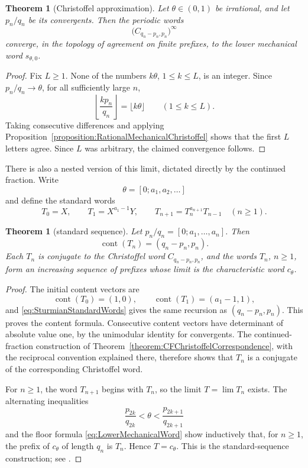 \documentclass{book}
\newtheorem{theorem}[definition]{Theorem}
\begin{document}
\begin{theorem}[Christoffel approximation]
  \label{theorem:ChristoffelApproximationSturmian}
  Let \(\theta\in(0,1)\) be irrational, and let \(p_n/q_n\) be its
  convergents.  Then the periodic words
  \[
    \bigl(C_{q_n-p_n,p_n}\bigr)^{\infty}
  \]
  converge, in the topology of agreement on finite prefixes, to the lower
  mechanical word \(s_{\theta,0}\).
\end{theorem}
\begin{proof}
  Fix \(L\geq1\).  None of the numbers \(k\theta\),
  \(1\leq k\leq L\), is an integer.  Since \(p_n/q_n\to\theta\), for all
  sufficiently large \(n\),
  \[
    \left\lfloor\frac{kp_n}{q_n}\right\rfloor
    =\lfloor k\theta\rfloor
    \qquad(1\leq k\leq L).
  \]
  Taking consecutive differences and applying
  Proposition~\ref{proposition:RationalMechanicalChristoffel} shows that
  the first \(L\) letters agree.  Since \(L\) was arbitrary, the claimed
  convergence follows.
\end{proof}

There is also a nested version of this limit, dictated directly by the
continued fraction.  Write
\[
  \theta=[0;a_1,a_2,\ldots]
\]
and define the \textnormal{standard words}
\begin{equation}\label{eq:SturmianStandardWords}
  T_0=X,\qquad T_1=X^{a_1-1}Y,\qquad
  T_{n+1}=T_n^{a_{n+1}}T_{n-1}\quad(n\geq1).
\end{equation}

\begin{theorem}[standard sequence]
  \label{theorem:SturmianStandardSequence}
  Let \(p_n/q_n=[0;a_1,\ldots,a_n]\).  Then
  \[
    \operatorname{cont}(T_n)=(q_n-p_n,p_n).
  \]
  Each \(T_n\) is conjugate to the Christoffel word
  \(C_{q_n-p_n,p_n}\), and the words \(T_n\), \(n\geq1\), form an
  increasing sequence of prefixes whose limit is the characteristic word
  \(c_\theta\).
\end{theorem}
\begin{proof}
  The initial content vectors are
  \[
    \operatorname{cont}(T_0)=(1,0),
    \qquad \operatorname{cont}(T_1)=(a_1-1,1),
  \]
  and \eqref{eq:SturmianStandardWords} gives the same recursion as
  \((q_n-p_n,p_n)\).  This proves the content formula.  Consecutive content
  vectors have determinant of absolute value one, by the unimodular
  identity for convergents.  The continued-fraction construction of
  Theorem~\ref{theorem:CFChristoffelCorrespondence}, with the reciprocal
  convention explained there, therefore shows that \(T_n\) is a conjugate
  of the corresponding Christoffel word.

  For \(n\geq1\), the word \(T_{n+1}\) begins with \(T_n\), so the limit
  \(T=\lim T_n\) exists.  The alternating inequalities
  \[
    \frac{p_{2k}}{q_{2k}}<\theta<
    \frac{p_{2k+1}}{q_{2k+1}}
  \]
  and the floor formula \eqref{eq:LowerMechanicalWord} show inductively
  that, for \(n\geq1\), the prefix of \(c_\theta\) of length \(q_n\) is
  \(T_n\).  Hence
  \(T=c_\theta\).  This is the standard-sequence construction; see
  \cite[Section~2.2]{Lothaire2002}.
\end{proof}
\end{document}
